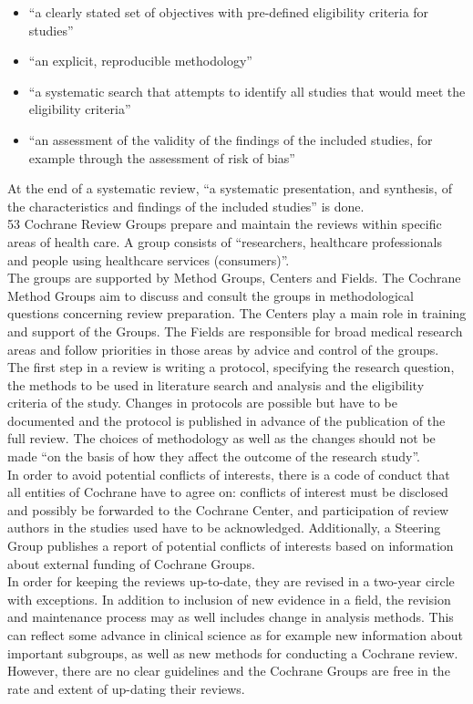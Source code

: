 \documentclass[11pt,a4paper,twoside]{book}\usepackage[]{graphicx}\usepackage[]{color}
\begin{document}
\begin{itemize}
\item``a clearly stated set of objectives with pre-defined eligibility criteria for studies''
\item ``an explicit, reproducible methodology''
\item ``a systematic search that attempts to identify all studies that would meet the eligibility criteria''
\item ``an assessment of the validity of the findings of the included studies, for example through the assessment of risk of bias''
\end{itemize}

At the end of a systematic review, ``a systematic presentation, and synthesis, of the characteristics and findings of the included studies'' is done. \\
53 Cochrane Review Groups prepare and maintain the reviews within specific areas of health care. A group consists of ``researchers, healthcare professionals and people using healthcare services (consumers)''. \\
The groups are supported by Method Groups, Centers and Fields. The Cochrane Method Groups aim to discuss and consult the groups in methodological questions concerning review preparation. The Centers play a main role in training and support of the Groups. The Fields are responsible for broad medical research areas and follow priorities in those areas by advice and control of the groups. \\
The first step in a review is writing a protocol, specifying the research question, the methods to be used in literature search and analysis and the eligibility criteria of the study. Changes in protocols are possible but have to be documented and the protocol is published in advance of the publication of the full review. The choices of methodology as well as the changes should not be made ``on the basis of how they affect the outcome of the research study''. \\
In order to avoid potential conflicts of interests, there is a code of conduct that all entities of Cochrane have to agree on: conflicts of interest must be disclosed and possibly be forwarded to the Cochrane Center, and participation of review authors in the studies used have to be acknowledged. Additionally, a Steering Group publishes a report of potential conflicts of interests based on information about external funding of Cochrane Groups. \\
In order for keeping the reviews up-to-date, they are revised in a two-year circle with exceptions. In addition to inclusion of new evidence in a field, the revision and maintenance process may as well includes change in analysis methods. This can reflect some advance in clinical science as for example new information about important subgroups, as well as new methods for conducting a Cochrane review. However, there are no clear guidelines and the Cochrane Groups are free in the rate and extent of up-dating their reviews.
\end{document}
